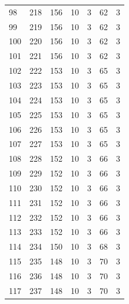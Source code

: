 \documentclass[a4paper,twoside,12pt]{book}
\begin{document}
\begin{appendices}
\begin{table}
\begin{tabular}{lrrrrrr}
		98  &    218 &       156 &        10 &               3 &              62 &         3 \\
		99  &    219 &       156 &        10 &               3 &              62 &         3 \\
		100 &    220 &       156 &        10 &               3 &              62 &         3 \\
		101 &    221 &       156 &        10 &               3 &              62 &         3 \\
		102 &    222 &       153 &        10 &               3 &              65 &         3 \\
		103 &    223 &       153 &        10 &               3 &              65 &         3 \\
		104 &    224 &       153 &        10 &               3 &              65 &         3 \\
		105 &    225 &       153 &        10 &               3 &              65 &         3 \\
		106 &    226 &       153 &        10 &               3 &              65 &         3 \\
		107 &    227 &       153 &        10 &               3 &              65 &         3 \\
		108 &    228 &       152 &        10 &               3 &              66 &         3 \\
		109 &    229 &       152 &        10 &               3 &              66 &         3 \\
		110 &    230 &       152 &        10 &               3 &              66 &         3 \\
		111 &    231 &       152 &        10 &               3 &              66 &         3 \\
		112 &    232 &       152 &        10 &               3 &              66 &         3 \\
		113 &    233 &       152 &        10 &               3 &              66 &         3 \\
		114 &    234 &       150 &        10 &               3 &              68 &         3 \\
		115 &    235 &       148 &        10 &               3 &              70 &         3 \\
		116 &    236 &       148 &        10 &               3 &              70 &         3 \\
		117 &    237 &       148 &        10 &               3 &              70 &         3 \\

\end{tabular}
\end{table}
\end{appendices}
\end{document}

